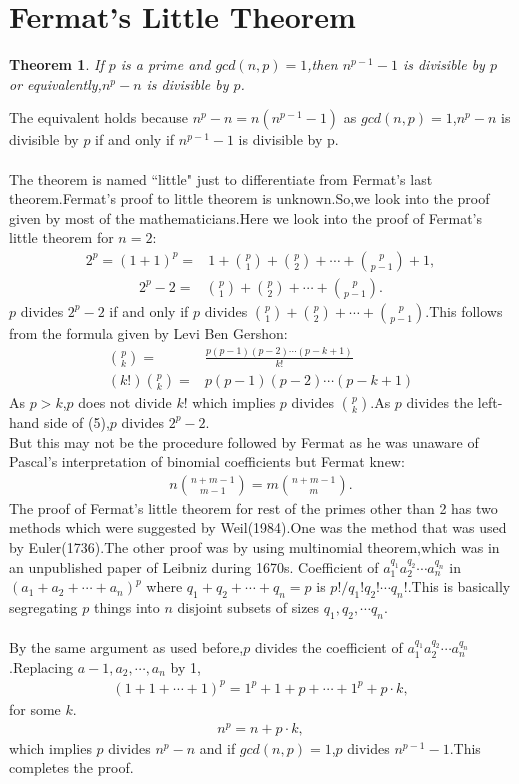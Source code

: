 \documentclass[a4paper,reqno,11pt]{book}
\theoremstyle{plain}%
\newtheorem{thm}{Theorem}[chapter]
\theoremstyle{definition}
\begin{document}
\section{Fermat's Little Theorem}
\begin{thm}
    If $p$ is a prime and $gcd(n,p)=1$,then $n^{p-1}-1$ is divisible by $p$ or equivalently,$n^p-n$ is divisible by $p$.
\end{thm}
The equivalent holds because $n^p-n=n(n^{p-1}-1)$ as $gcd(n,p)=1$,$n^p-n$ is divisible by $p$ if and only if $n^{p-1}-1$ is divisible by p.\\
\\
The theorem is named ``little" just to differentiate from Fermat's last theorem.Fermat's proof to little theorem is unknown.So,we look into the proof given by most of the mathematicians.Here we look into the proof of Fermat's little theorem for $n=2$:
\begin{align*}
    2^p=(1+1)^p=&1+\binom{p}{1}+\binom{p}{2}+\cdots+\binom{p}{p-1}+1,
\end{align*}
\begin{align}
     2^p-2=&\binom{p}{1}+\binom{p}{2}+\cdots+\binom{p}{p-1}.
\end{align}
$p$ divides $2^p-2$ if and only if $p$ divides $\binom{p}{1}+\binom{p}{2}+\cdots+\binom{p}{p-1}$.This follows from the formula given by Levi Ben Gershon:
\begin{align*}
    \binom{p}{k}=&\frac{p(p-1)(p-2)\cdots(p-k+1)}{k!}\\
    (k!)\binom{p}{k}=&p(p-1)(p-2)\cdots(p-k+1)
\end{align*}
As $p>k$,$p$ does not divide $k!$ which implies $p$ divides $\binom{p}{k}$.As $p$ divides the left-hand side of (5),$p$ divides $2^p-2$.\\
But this may not be the procedure followed by Fermat as he was unaware of Pascal's interpretation of binomial coefficients but Fermat knew:
\begin{eqnarray*}
    n\binom{n+m-1}{m-1}=m\binom{n+m-1}{m}.
\end{eqnarray*}
The proof of Fermat's little theorem for rest of the primes other than 2 has two methods which were suggested by Weil(1984).One was the method that was used by Euler(1736).The other proof was by using multinomial theorem,which was in an unpublished paper of Leibniz during 1670s.
Coefficient of $a_{1}^{q_{1}}a_{2}^{q_{2}}\cdots a_{n}^{q_{n}}$ in $(a_{1}+a_{2}+\cdots+a_{n})^p$ where $q_{1}+q_{2}+\cdots+q_{n}=p$ is $p!/q_{1}!q_{2}!\cdots q_{n}!$.This is basically segregating $p$ things into $n$ disjoint subsets of sizes $q_{1},q_{2},\cdots q_{n}$.\\
\\
By the same argument as used before,$p$ divides the coefficient of $a_{1}^{q_{1}}a_{2}^{q_{2}}\cdots a_{n}^{q_{n}}$.Replacing $a-{1},a_{2},\cdots,a_{n}$ by 1,
\begin{eqnarray*}
    (1+1+\cdots+1)^p=1^p+1+p+\cdots+1^p+p\cdot k,
\end{eqnarray*}
for some $k$.
\begin{eqnarray*}
    n^p=n+p\cdot k,
\end{eqnarray*}
which implies $p$ divides $n^p-n$ and if $gcd(n,p)=1$,$p$ divides $n^{p-1}-1$.This completes the proof.
\end{document}
